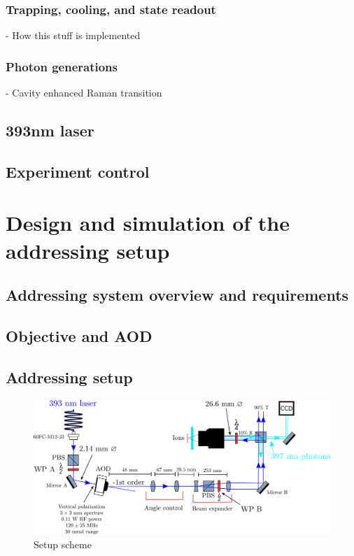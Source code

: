 \documentclass[english, a4paper, 12pt, twoside]{book}
\numberwithin{equation}{section} %
\begin{document}
\subsection{Trapping, cooling, and state readout}
- How this stuff is implemented
\subsection{Photon generations}
- Cavity enhanced Raman transition
\section{393nm laser}
\section{Experiment control}
\chapter{Design and simulation of the addressing setup}
\section{Addressing system overview and requirements}
\section{Objective and AOD}
\section{Addressing setup}

\begin{figure}[H]
\centering
\includegraphics[width=\textwidth]{img/setup}
\caption{Setup scheme}
\end{figure}
\end{document}
